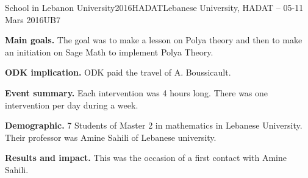 \begin{event}{School in Lebanon University}{2016HADAT}{Lebanese University, HADAT -- 05-11 Mars 2016}{UB}{7}{}

\textbf{Main goals.} The goal was to make a lesson on Polya theory and then
to make an initiation on Sage Math to implement Polya Theory.

\textbf{ODK implication.} ODK paid the travel of A. Boussicault.

\textbf{Event summary.}
Each intervention was 4 hours long. There was one intervention per day during 
a week.

\textbf{Demographic.} 7 Students of Master 2 in mathematics in Lebanese University.
Their professor was Amine Sahili of Lebanese university.

\textbf{Results and impact.}
This was the occasion of a first contact with Amine Sahili.


\end{event}
